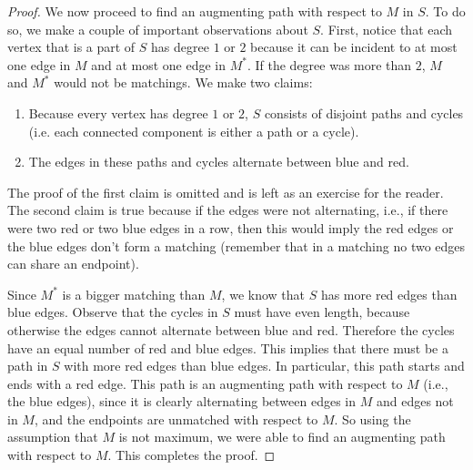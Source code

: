 \begin{flex}
\begin{proof}
We now proceed to find an augmenting path with respect to $M$ in $S$. To do so, we make a couple of important observations about $S$. First, notice that each vertex that is a part of $S$ has degree $1$ or $2$ because it can be incident to at most one edge in $M$ and at most one edge in $M^*$. If the degree was more than $2$, $M$ and $M^*$ would not be matchings. We make two claims:
\begin{enumerate}
    \item Because every vertex has degree $1$ or $2$, $S$ consists of disjoint paths and cycles (i.e. each connected component is either a path or a cycle).
    \item The edges in these paths and cycles alternate between blue and red.
\end{enumerate} 
The proof of the first claim is omitted and is left as an exercise for the reader. The second claim is true because if the edges were not alternating, i.e., if there were two red or two blue edges in a row, then this would imply the red edges or the blue edges don't form a matching (remember that in a matching no two edges can share an endpoint).

Since $M^*$ is a bigger matching than $M$, we know that $S$ has more red edges than blue edges. Observe that the cycles in $S$ must have even length, because otherwise the edges cannot alternate between blue and red. Therefore the cycles have an equal number of red and blue edges. This implies that there must be a path in $S$ with more red edges than blue edges. In particular, this path starts and ends with a red edge. This path is an augmenting path with respect to $M$ (i.e., the blue edges), since it is clearly alternating between edges in $M$ and edges not in $M$, and the endpoints are unmatched with respect to $M$. So using the assumption that $M$ is not maximum, we were able to find an augmenting path with respect to $M$. This completes the proof.
\end{proof}
\end{flex}


